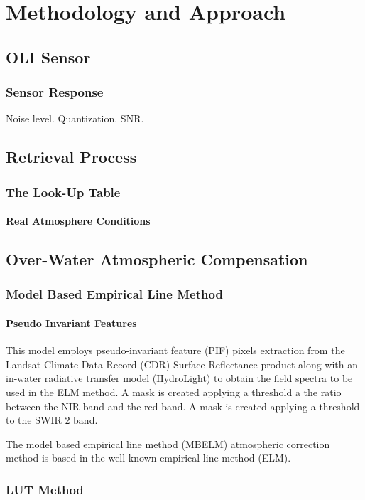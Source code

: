 \chapter{Methodology and Approach}
\section{OLI Sensor}
\subsection{Sensor Response}
Noise level. Quantization. SNR.

\section{Retrieval Process}
\subsection{The Look-Up Table}


\subsubsection{Real Atmosphere Conditions}



\section{Over-Water Atmospheric Compensation}
\subsection{Model Based Empirical Line Method}

\subsubsection{Pseudo Invariant Features}

This model employs pseudo-invariant feature (PIF) pixels extraction from the Landsat Climate Data Record (CDR) Surface Reflectance product along with an in-water radiative transfer model (HydroLight) to obtain the field spectra to be used in the ELM method. 
 A mask is created applying a threshold a the ratio between the NIR band and the red band. 
 A mask is created applying a threshold to the SWIR 2 band. 

The model based empirical line method (MBELM) atmospheric correction method is based in the well known empirical line method (ELM).

\subsection{LUT Method}